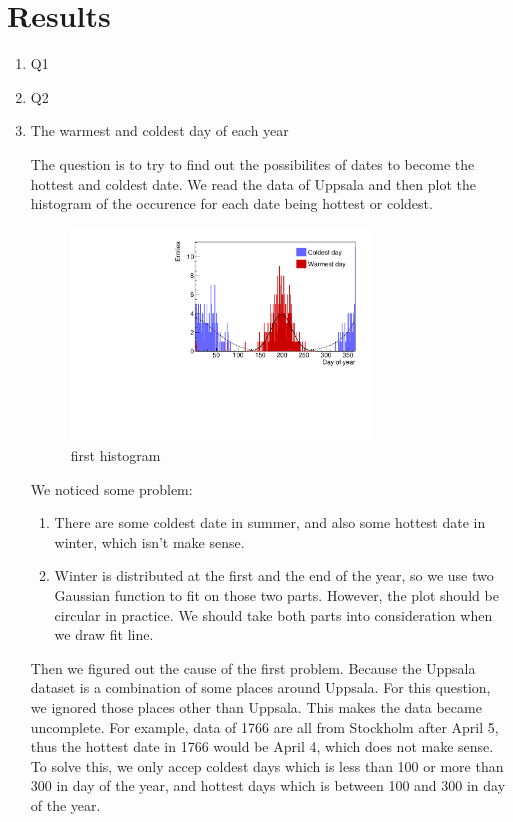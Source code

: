 \documentclass[a4paper]{article}
\begin{document}
\section{Results}
\begin{enumerate}

\item Q1
\item Q2
\item The warmest and coldest day of each year

The question is to try to find out the possibilites of dates to become the hottest and coldest date. We read the data of Uppsala and then plot the histogram of the occurence for each date being hottest or coldest. 

\begin{figure}[htp]
    \centering
    \includegraphics[width=8cm]{./images/hotCold_Upp_prev}
    \caption{first histogram}
    \label{fig:hist}
\end{figure}

We noticed some problem:
\begin{enumerate}
\item There are some coldest date in summer, and also some hottest date in winter, which isn't make sense.
\item Winter is distributed at the first and the end of the year, so we use two Gaussian function to fit on those two parts. However, the plot should be circular in practice. We should take both parts into consideration when we draw fit line.
\end{enumerate}
Then we figured out the cause of the first problem. Because the Uppsala dataset is a combination of some places around Uppsala. For this question, we ignored those places other than Uppsala. This makes the data became uncomplete. For example, data of 1766 are all from Stockholm after April 5, thus the hottest date in 1766 would be April 4, which does not make sense. To solve this, we only accep coldest days which is less than 100 or more than 300 in day of the year, and hottest days which is between 100 and 300 in day of the year.


\end{enumerate}
\end{document}
